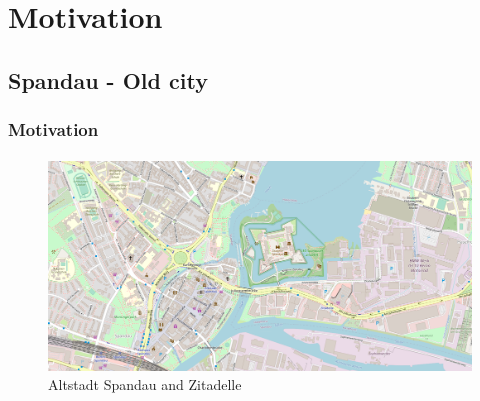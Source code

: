 \documentclass[light]{lutbeamer} %
\begin{document}

\section{Motivation}
\subsection{Spandau - Old city}
\begin{frame}
\frametitle{Motivation}
\framesubtitle{}
\vspace{5mm}
\begin{figure}
    \centering
        \includegraphics[height=0.65\paperheight]{figures/maps/map_spandau_detail.png}
        \caption{Altstadt Spandau and Zitadelle \cite{OpenStreetMap}}
    \label{fig:enter-label}
\end{figure}

\end{frame}
\end{document}
